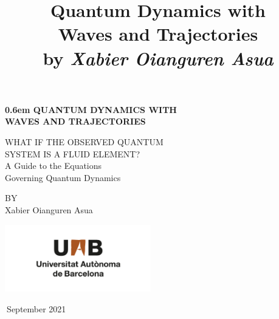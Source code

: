 \documentclass[11pt, a4paper]{article} %
\title{\vspace{-2cm} {\bf Quantum Dynamics  with\\ Waves and Trajectories}\\{\small by {\em Xabier Oianguren Asua}}\vspace{-0.8cm}}
\date{\vspace{-11ex}}
\begin{document}
\clearpage
\newcommand\nbvspace[1][3]{\vspace*{\stretch{#1}}}
\newcommand\nbstretchyspace{\spaceskip0.5em plus 0.25em minus 0.25em}
\newcommand{\nbtitlestretch}{\spaceskip0.6em}
\pagestyle{empty}
\begin{center}
\bfseries
\nbvspace[1]
\Huge
{\nbtitlestretch\huge
QUANTUM DYNAMICS WITH \\ WAVES AND TRAJECTORIES}

\nbvspace[1]
\normalsize

WHAT IF THE OBSERVED QUANTUM\\
SYSTEM IS A FLUID ELEMENT?\\
\nbvspace[1]
A Guide to the Equations \\Governing Quantum Dynamics

\nbvspace[1]
\small BY\\
\Large Xabier Oianguren Asua\\[0.5em]


\nbvspace[6]

\includegraphics[width=2.5in]{UAB.png}
\normalsize
\vspace{-0.5cm}

\large
\small
\small
$\ $September 2021 
\nbvspace[1]
\end{center}
\newpage
\null
\clearpage

\maketitle
{}
\setlength{\cftbeforesecskip}{0.4cm}
\setlength{\cftbeforesubsecskip}{0.4cm}
\setlength{\cftbeforesubsubsecskip}{0.25cm}
\end{document}
